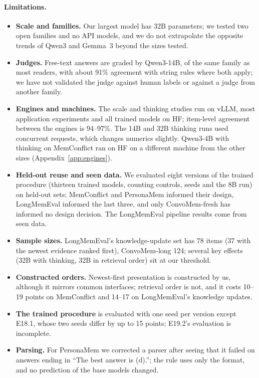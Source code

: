 \documentclass[11pt]{article}
\begin{document}
\paragraph{Limitations.}
\begin{itemize}
  \item \textbf{Scale and families.} Our largest model has 32B parameters; we tested two open families and no API models, and we do not extrapolate the opposite trends of Qwen3 and Gemma~3 beyond the sizes tested.
  \item \textbf{Judges.} Free-text answers are graded by Qwen3-14B, of the same family as most readers, with about 91\% agreement with string rules where both apply; we have not validated the judge against human labels or against a judge from another family.
  \item \textbf{Engines and machines.} The scale and thinking studies run on vLLM, most application experiments and all trained models on HF; item-level agreement between the engines is 94--97\%. The 14B and 32B thinking runs used concurrent requests, which changes numerics slightly. Qwen3-4B with thinking on MemConflict ran on HF on a different machine from the other sizes (Appendix~\ref{app:engines}).
  \item \textbf{Held-out reuse and seen data.} We evaluated eight versions of the trained procedure (thirteen trained models, counting controls, seeds and the 8B run) on held-out sets; MemConflict and PersonaMem informed their design, LongMemEval informed the last three, and only ConvoMem-fresh has informed no design decision. The LongMemEval pipeline results come from seen data.
  \item \textbf{Sample sizes.} LongMemEval's knowledge-update set has 78 items (37 with the newest evidence ranked first), ConvoMem-long 124; several key effects (32B with thinking, 32B in retrieval order) sit at our threshold.
  \item \textbf{Constructed orders.} Newest-first presentation is constructed by us, although it mirrors common interfaces; retrieval order is not, and it costs 10--19 points on MemConflict and 14--17 on LongMemEval's knowledge updates.
  \item \textbf{The trained procedure} is evaluated with one seed per version except E18.1, whose two seeds differ by up to 15 points; E19.2's evaluation is incomplete.
  \item \textbf{Parsing.} For PersonaMem we corrected a parser after seeing that it failed on answers ending in ``The best answer is (d).''; the rule uses only the format, and no prediction of the base models changed.
\end{itemize}
\end{document}
